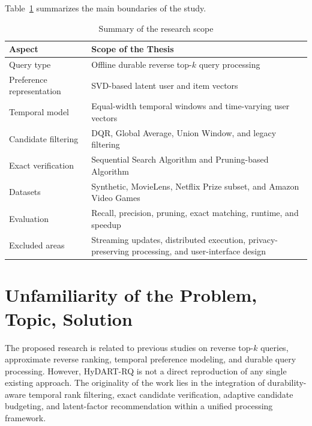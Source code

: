 Table~\ref{tab:scope_summary} summarizes the main boundaries of the study.

\begin{table}[htbp]
\centering
\caption{Summary of the research scope}
\label{tab:scope_summary}
\small
\renewcommand{\arraystretch}{1.25}
\setlength{\tabcolsep}{5pt}
\begin{tabularx}{\textwidth}{|p{3.3cm}|X|}
\hline
\textbf{Aspect} &
\textbf{Scope of the Thesis} \\
\hline
Query type &
Offline durable reverse top-$k$ query processing \\
\hline
Preference representation &
SVD-based latent user and item vectors \\
\hline
Temporal model &
Equal-width temporal windows and time-varying user vectors \\
\hline
Candidate filtering &
DQR, Global Average, Union Window, and legacy filtering \\
\hline
Exact verification &
Sequential Search Algorithm and Pruning-based Algorithm \\
\hline
Datasets &
Synthetic, MovieLens, Netflix Prize subset, and Amazon Video Games \\
\hline
Evaluation &
Recall, precision, pruning, exact matching, runtime, and speedup \\
\hline
Excluded areas &
Streaming updates, distributed execution, privacy-preserving processing, and user-interface design \\
\hline
\end{tabularx}
\end{table}


\section{Unfamiliarity of the Problem, Topic, Solution}
\label{sec:unfamiliarity}

The proposed research is related to previous studies on reverse top-$k$ queries, approximate reverse ranking, temporal preference modeling, and durable query processing. However, HyDART-RQ is not a direct reproduction of any single existing approach. The originality of the work lies in the integration of durability-aware temporal rank filtering, exact candidate verification, adaptive candidate budgeting, and latent-factor recommendation within a unified processing framework.

